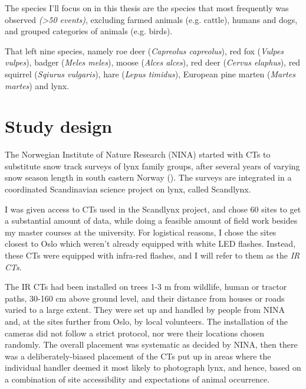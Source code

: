 
The species I'll focus on in this thesis are the species that most frequently was observed \emph{(>50 events)}, excluding farmed animals (e.g. cattle), humans and dogs, and grouped categories of animals (e.g. birds).

That left nine species, namely roe deer (\textit{Capreolus capreolus}), red fox (\textit{Vulpes vulpes}), badger (\textit{Meles meles}), moose (\textit{Alces alces}), red deer (\textit{Cervus elaphus}), red squirrel (\textit{Sqiurus vulgaris}), hare (\textit{Lepus timidus}), European pine marten (\textit{Martes martes}) and lynx. 




\section{Study design} 


The Norwegian Institute of Nature Research (NINA) started with CTs to substitute snow track surveys of lynx family groups, after several years of varying snow season length in south eastern Norway (\cite{Odden2015}). The surveys are integrated in a coordinated Scandinavian science project on lynx, called Scandlynx. %

I was given access to CTs used in the Scandlynx project, and chose 60 sites to get a substantial amount of data, while doing a feasible amount of field work besides my master courses at the university.
For logistical reasons, I chose the sites closest to Oslo which weren't already equipped with white LED flashes. 
Instead, these CTs were equipped with infra-red flashes, and I will refer to them as the \emph{IR CTs}.


The IR CTs had been installed on trees 1-3 m from wildlife, human or tractor paths, 30-160 cm above ground level, and their distance from houses or roads varied to a large extent.
They were set up and handled by people from NINA and, at the sites further from Oslo, by local volunteers. %
The installation of the cameras did not follow a strict protocol, nor were their locations chosen randomly. The overall placement was systematic as decided by NINA, then there was a deliberately-biased placement of the CTs put up in areas where the individual handler deemed it most likely to photograph lynx, and hence, based on a combination of site accessibility and expectations of animal occurrence. %


